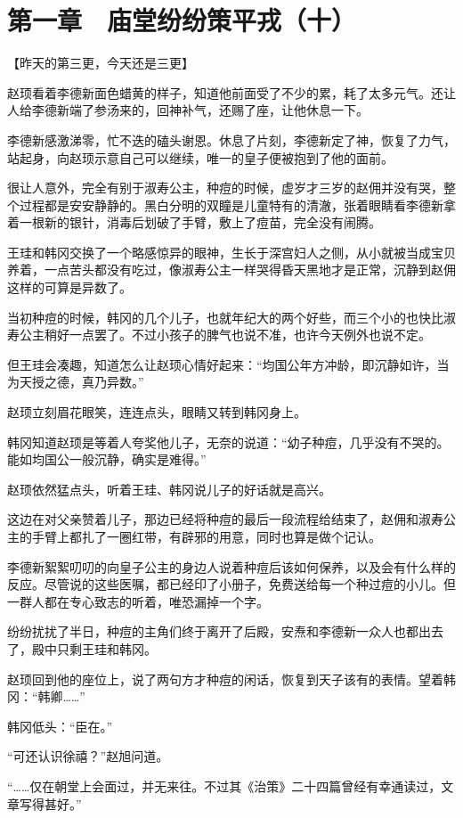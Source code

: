 \section{第一章　庙堂纷纷策平戎（十）}

【昨天的第三更，今天还是三更】

赵顼看着李德新面色蜡黄的样子，知道他前面受了不少的累，耗了太多元气。还让人给李德新端了参汤来的，回神补气，还赐了座，让他休息一下。

李德新感激涕零，忙不迭的磕头谢恩。休息了片刻，李德新定了神，恢复了力气，站起身，向赵顼示意自己可以继续，唯一的皇子便被抱到了他的面前。

很让人意外，完全有别于淑寿公主，种痘的时候，虚岁才三岁的赵佣并没有哭，整个过程都是安安静静的。黑白分明的双瞳是儿童特有的清澈，张着眼睛看李德新拿着一根新的银针，消毒后划破了手臂，敷上了痘苗，完全没有闹腾。

王珪和韩冈交换了一个略感惊异的眼神，生长于深宫妇人之侧，从小就被当成宝贝养着，一点苦头都没有吃过，像淑寿公主一样哭得昏天黑地才是正常，沉静到赵佣这样的可算是异数了。

当初种痘的时候，韩冈的几个儿子，也就年纪大的两个好些，而三个小的也快比淑寿公主稍好一点罢了。不过小孩子的脾气也说不准，也许今天例外也说不定。

但王珪会凑趣，知道怎么让赵顼心情好起来：“均国公年方冲龄，即沉静如许，当为天授之德，真乃异数。”

赵顼立刻眉花眼笑，连连点头，眼睛又转到韩冈身上。

韩冈知道赵顼是等着人夸奖他儿子，无奈的说道：“幼子种痘，几乎没有不哭的。能如均国公一般沉静，确实是难得。”

赵顼依然猛点头，听着王珪、韩冈说儿子的好话就是高兴。

这边在对父亲赞着儿子，那边已经将种痘的最后一段流程给结束了，赵佣和淑寿公主的手臂上都扎了一圈红带，有辟邪的用意，同时也算是做个记认。

李德新絮絮叨叨的向皇子公主的身边人说着种痘后该如何保养，以及会有什么样的反应。尽管说的这些医嘱，都已经印了小册子，免费送给每一个种过痘的小儿。但一群人都在专心致志的听着，唯恐漏掉一个字。

纷纷扰扰了半日，种痘的主角们终于离开了后殿，安焘和李德新一众人也都出去了，殿中只剩王珪和韩冈。

赵顼回到他的座位上，说了两句方才种痘的闲话，恢复到天子该有的表情。望着韩冈：“韩卿……”

韩冈低头：“臣在。”

“可还认识徐禧？”赵旭问道。

“……仅在朝堂上会面过，并无来往。不过其《治策》二十四篇曾经有幸通读过，文章写得甚好。”


